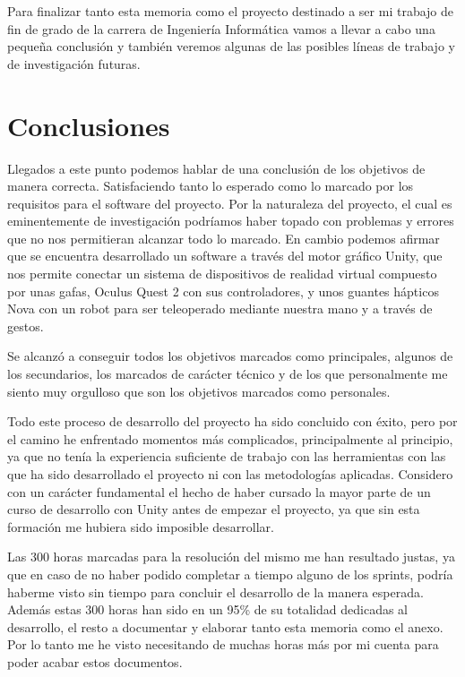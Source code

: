 Para finalizar tanto esta memoria como el proyecto destinado a ser mi trabajo de fin de grado de la carrera de Ingeniería Informática vamos a llevar a cabo una pequeña conclusión y también veremos algunas de las posibles líneas de trabajo y de investigación futuras.

\section{Conclusiones}
Llegados a este punto podemos hablar de una conclusión de los objetivos de manera correcta. Satisfaciendo tanto lo esperado como lo marcado por los requisitos para el software del proyecto. Por la naturaleza del proyecto, el cual es eminentemente de investigación podríamos haber topado con problemas y errores que no nos permitieran alcanzar todo lo marcado. En cambio podemos afirmar que se encuentra desarrollado un software a través del motor\cite{MotorGrafico} gráfico Unity\cite{Unity}, que nos permite conectar un sistema de dispositivos de realidad virtual\cite{VR} compuesto por unas gafas, Oculus Quest 2 con sus controladores, y unos guantes hápticos Nova con un robot para ser teleoperado mediante nuestra mano y a través de gestos.

Se alcanzó a conseguir todos los objetivos marcados como principales, algunos de los secundarios, los marcados de carácter técnico y de los que personalmente me siento muy orgulloso que son los objetivos marcados como personales.

Todo este proceso de desarrollo del proyecto ha sido concluido con éxito, pero por el camino he enfrentado momentos más complicados, principalmente al principio, ya que no tenía la experiencia suficiente de trabajo con las herramientas con las que ha sido desarrollado el proyecto ni con las metodologías aplicadas.
Considero con un carácter fundamental el hecho de haber cursado la mayor parte de un curso de desarrollo con Unity antes de empezar el proyecto, ya que sin esta formación me hubiera sido imposible desarrollar.

Las 300 horas marcadas para la resolución del mismo me han resultado justas, ya que en caso de no haber podido completar a tiempo alguno de los sprints, podría haberme visto sin tiempo para concluir el desarrollo de la manera esperada. Además estas 300 horas han sido en un 95\% de su totalidad dedicadas al desarrollo, el resto a documentar y elaborar tanto esta memoria como el anexo. Por lo tanto me he visto necesitando de muchas horas más por mi cuenta para poder acabar estos documentos.


